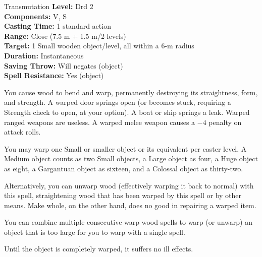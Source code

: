 {Transmutation}
{
	\textbf{Level:}
	Drd 2\\
	\textbf{Components:}
	V, S\\
	\textbf{Casting Time:}
	1 standard action\\
	\textbf{Range:}
	Close (7.5 m + 1.5 m/2 levels)\\
	\textbf{Target:}
	1 Small wooden object/level, all within a 6-m radius\\
	\textbf{Duration:}
	Instantaneous\\
	\textbf{Saving Throw:}
	Will negates (object)\\
	\textbf{Spell Resistance:}
	Yes (object)\\
}
{
	You cause wood to bend and warp, permanently destroying its straightness, form, and strength. A warped door springs open (or becomes stuck, requiring a Strength check to open, at your option). A boat or ship springs a leak. Warped ranged weapons are useless. A warped melee weapon causes a $-4$ penalty on attack rolls.

	You may warp one Small or smaller object or its equivalent per caster level. A Medium object counts as two Small objects, a Large object as four, a Huge object as eight, a Gargantuan object as sixteen, and a Colossal object as thirty-two.

	Alternatively, you can unwarp wood (effectively warping it back to normal) with this spell, straightening wood that has been warped by this spell or by other means. Make whole, on the other hand, does no good in repairing a warped item.

	You can combine multiple consecutive warp wood spells to warp (or unwarp) an object that is too large for you to warp with a single spell.

	Until the object is completely warped, it suffers no ill effects.

}
